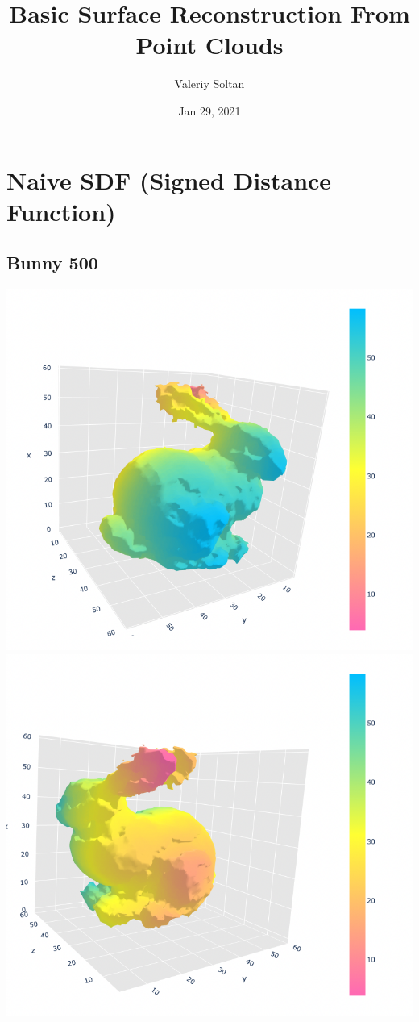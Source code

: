 \documentclass{article}
\title{Basic Surface Reconstruction From Point Clouds}
\author{Valeriy Soltan}
\date{Jan 29, 2021}
\begin{document}
\maketitle    

\section*{Naive SDF (Signed Distance Function)}

\subsection*{Bunny 500}
\includegraphics[scale=0.4]{images/500naive}
\newline 
\includegraphics[scale=0.4]{images/500naive2}
\end{document}
